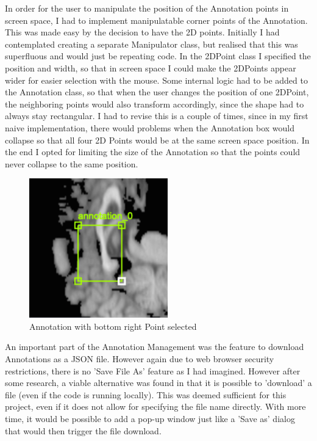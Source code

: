 \documentclass[a4paper,11pt,titlepage]{article}
\begin{document}
In order for the user to manipulate the position of the Annotation points in screen space, I had to implement manipulatable corner points of the Annotation. This was made easy by the decision to have the 2D points. Initially I had contemplated creating a separate Manipulator class, but realised that this was superfluous and would just be repeating code. In the 2DPoint class I specified the position and width, so that in screen space I could make the 2DPoints appear wider for easier selection with the mouse. Some internal logic had to be added to the Annotation class, so that when the user changes the position of one 2DPoint, the neighboring points would also transform accordingly, since the shape had to always stay rectangular. I had to revise this is a couple of times, since in my first naive implementation, there would problems when the Annotation box would collapse so that all four 2D Points would be at the same screen space position. In the end I opted for limiting the size of the Annotation so that the points could never collapse to the same position.

\begin{figure}[ht!]
\centering
\includegraphics[width=60mm]{graphics/annoSelected_01.png}
\caption{Annotation with bottom right Point selected }
\label{fig:UIdesign1}
\end{figure}


An important part of the Annotation Management was the feature to download Annotations as a JSON file. However again due to web browser security restrictions, there is no 'Save File As' feature as I had imagined. However after some research, a viable alternative was found in that it is possible to 'download' a file (even if the code is running locally). This was deemed sufficient for this project, even if it does not allow for specifying the file name directly. With more time, it would be possible to add a pop-up window just like a 'Save as' dialog that would then trigger the file download.
\end{document}
